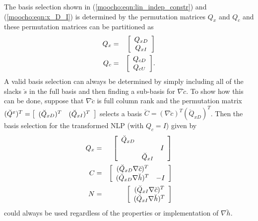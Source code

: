 \documentclass[pdf,12pt,report]{SANDreport}
\begin{document}
The basis selection shown in (\ref{moocho:eqn:lin_indep_constr}) and
(\ref{moocho:eqn:x_D_I}) is determined by the permutation matrices $Q_x$ and
$Q_c$ and these permutation matrices can be partitioned as
%
\begin{eqnarray}
Q_{x} & = & {\bmat{c} Q_{xD} \\ Q_{xI} \emat} \label{moocho:eqn:Qx} \\
Q_{c} & = & {\bmat{c} Q_{cD} \\ Q_{cU} \emat} \label{moocho:eqn:Qc}.
\end{eqnarray}
%
A valid basis selection can always be determined by simply including all of
the slacks $\breve{s}$ in the full basis and then finding a sub-basis for
$\nabla \breve{c}$.  To show how this can be done, suppose that $\nabla
\breve{c}$ is full column rank and the permutation matrix $(\breve{Q}^x)^T =
{\bmat{cc} (\breve{Q}_{xD})^T & (\breve{Q}_{xI})^T \emat}$ selects a basis
$\breve{C} = (\nabla \breve{c})^T (\breve{Q}_{xD})^T$.  Then the basis
selection for the transformed NLP (with $Q_c = I$) given by
%
\begin{eqnarray}
Q_x & = & {\bmat{ccc}
 \breve{Q}_{xD}  &                &     \\
                 &                & I   \\
                 & \breve{Q}_{xI} &
\emat} \\
C & = & {\bmat{cc} ( \breve{Q}_{xD} \nabla \breve{c} )^T \\ ( \breve{Q}_{xD} \nabla \breve{h} )^T & -I \emat}
	\label{moocho:eqn:C_with_slacks} \\
N & = & {\bmat{c} ( \breve{Q}_{xI} \nabla \breve{c} )^T \\ ( \breve{Q}_{xI} \nabla \breve{h} )^T \emat}
\end{eqnarray}
%
could always be used regardless of the properties or implementation of $\nabla
\breve{h}$.
\end{document}

